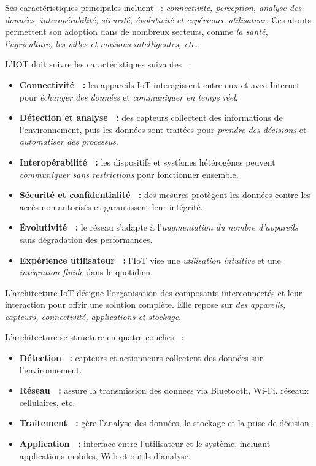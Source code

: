 Ses caractéristiques principales incluent ~: \emph{connectivité, perception, analyse des données, interopérabilité, sécurité, évolutivité et expérience utilisateur.} Ces atouts permettent son adoption dans de nombreux secteurs, comme \emph{la santé, l'agriculture, les villes et maisons intelligentes, etc.}

L'IOT doit suivre les caractéristiques suivantes ~:

\begin{itemize}
  \item \textbf{Connectivité ~:} les appareils IoT interagissent entre eux et avec 
  Internet pour \textit{échanger des données} et \textit{communiquer en temps réel}.  
  \item \textbf{Détection et analyse ~:} des capteurs collectent des informations de 
  l'environnement, puis les données sont traitées pour \textit{prendre des décisions} 
  et \textit{automatiser des processus}.  
  \item \textbf{Interopérabilité ~:} les dispositifs et systèmes hétérogènes 
  peuvent \textit{communiquer sans restrictions} pour fonctionner ensemble.  
  \item \textbf{Sécurité et confidentialité ~:} des mesures protègent les données 
  contre les accès non autorisés et garantissent leur intégrité.  
  \item \textbf{Évolutivité ~:} le réseau s'adapte à l'\textit{augmentation du 
  nombre d'appareils} sans dégradation des performances.  
  \item \textbf{Expérience utilisateur ~:} l'IoT vise une \textit{utilisation 
  intuitive} et une \textit{intégration fluide} dans le quotidien.
\end{itemize}

L'architecture IoT désigne l'organisation des composants interconnectés et leur interaction pour offrir une solution complète. Elle repose sur \textit{des appareils, capteurs, connectivité, applications et stockage}.  

L'architecture se structure en quatre couches ~:  
\begin{itemize}
  \item \textbf{Détection ~:} capteurs et actionneurs collectent des données sur l'environnement.  
  \item \textbf{Réseau ~:} assure la transmission des données via Bluetooth, Wi-Fi, réseaux cellulaires, etc.  
  \item \textbf{Traitement ~:} gère l'analyse des données, le stockage et la prise de décision.  
  \item \textbf{Application ~:} interface entre l'utilisateur et le système, incluant applications mobiles, Web et outils d'analyse.  
\end{itemize}

